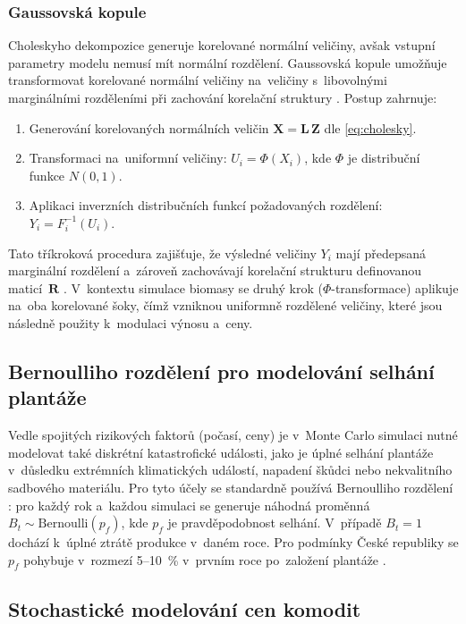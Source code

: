 \subsubsection{Gaussovská kopule}
\label{subsubsec:gauss-copula}
Choleskyho dekompozice generuje korelované normální veličiny, avšak 
vstupní parametry modelu nemusí mít normální rozdělení. Gaussovská 
kopule umožňuje transformovat korelované normální veličiny 
na~veličiny s~libovolnými marginálními rozděleními při zachování 
korelační struktury \citep{Nelsen2006}. Postup zahrnuje:
\begin{enumerate}
  \item Generování korelovaných normálních veličin 
  $\mathbf{X} = \mathbf{L}\,\mathbf{Z}$ dle \eqref{eq:cholesky}.
  \item Transformaci na~uniformní veličiny: $U_i = \Phi(X_i)$, 
  kde $\Phi$ je distribuční funkce $N(0,1)$.
  \item Aplikaci inverzních distribučních funkcí požadovaných 
  rozdělení: $Y_i = F_i^{-1}(U_i)$.
\end{enumerate}
Tato tříkroková procedura zajišťuje, že výsledné veličiny $Y_i$ 
mají předepsaná marginální rozdělení a~zároveň zachovávají 
korelační strukturu definovanou maticí~$\mathbf{R}$ 
\citep{Nelsen2006}. V~kontextu simulace biomasy se druhý krok 
($\Phi$-transformace) aplikuje na~oba korelované šoky, čímž 
vzniknou uniformně rozdělené veličiny, které jsou následně 
použity k~modulaci výnosu a~ceny.

\subsection{Bernoulliho rozdělení pro modelování selhání plantáže}
\label{subsec:bernoulli}

Vedle spojitých rizikových faktorů (počasí, ceny) je v~Monte Carlo 
simulaci nutné modelovat také diskrétní katastrofické události, 
jako je úplné selhání plantáže v~důsledku extrémních klimatických 
událostí, napadení škůdci nebo nekvalitního sadbového materiálu. 
Pro tyto účely se standardně používá Bernoulliho rozdělení 
\citep{Vose2008}: pro každý rok a~každou simulaci se generuje 
náhodná proměnná $B_t \sim \mathrm{Bernoulli}(p_f)$, kde $p_f$ 
je pravděpodobnost selhání. V~případě $B_t = 1$ dochází k~úplné 
ztrátě produkce v~daném roce. Pro podmínky České republiky se 
$p_f$ pohybuje v~rozmezí 5--10~\% v~prvním roce po~založení 
plantáže \citep{knapek_2024}.

\subsection{Stochastické modelování cen komodit}
\label{subsec:modelovani-cen}

